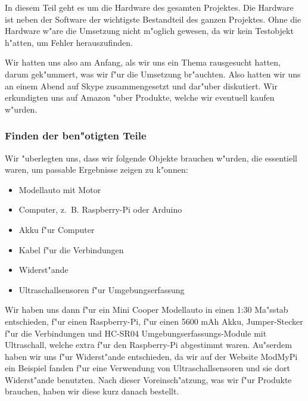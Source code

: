 \documentclass[a4paper,12pt]{article}
\newenvironment{smallitemize}{
	\begin{itemize}
		\setlength{\itemsep}{0pt}
		\setlength{\parskip}{0pt}
		\setlength{\parsep}{0pt}
}
{
	\end{itemize}
}
\begin{document}
In diesem Teil geht es um die Hardware des gesamten Projektes.
Die Hardware ist neben der Software der wichtigste Bestandteil des ganzen Projektes.
Ohne die Hardware w"are die Umsetzung nicht m"oglich gewesen, da wir kein Testobjekt h"atten, um Fehler herauszufinden.

Wir hatten uns also am Anfang, als wir uns ein Thema rausgesucht hatten, darum gek"ummert, was wir f"ur die Umsetzung br"auchten.
Also hatten wir uns an einem Abend auf Skype zusammengesetzt und dar"uber diskutiert.
Wir erkundigten uns auf Amazon "uber Produkte, welche wir eventuell kaufen w"urden.

\subsubsection{Finden der ben"otigten Teile}\label{sec2.1.1}

Wir "uberlegten uns, dass wir folgende Objekte brauchen w"urden, die essentiell waren, um passable Ergebnisse zeigen zu k"onnen:

\begin{smallitemize}
	\item Modellauto mit Motor
	\item Computer, z.~B. Raspberry-Pi oder Arduino
	\item Akku f"ur Computer
	\item Kabel f"ur die Verbindungen
	\item Widerst"ande
	\item Ultraschallsensoren f"ur Umgebungserfassung
\end{smallitemize}

Wir haben uns dann f"ur ein Mini Cooper Modellauto in einen 1:30 Ma"sstab entschieden, f"ur einen Raspberry-Pi, f"ur einen 5600 mAh Akku, Jumper-Stecker f"ur die Verbindungen und HC-SR04 Umgebungserfassungs-Module mit Ultraschall, welche extra f"ur den Raspberry-Pi abgestimmt waren.
Au"serdem haben wir uns f"ur Widerst"ande entschieden, da wir auf der Website ModMyPi \cite{ModMyPi} ein Beispiel fanden f"ur eine Verwendung von Ultraschallsensoren und sie dort Widerst"ande benutzten.
Nach dieser Voreinsch"atzung, was wir f"ur Produkte brauchen, haben wir diese kurz danach bestellt.
\end{document}
